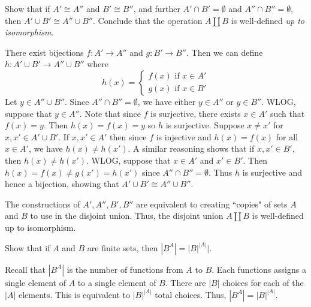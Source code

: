 \documentclass[../../master.tex]{subfiles}
\begin{document}
  \begin{problem}
    Show that if \(A' \cong A''\) and \(B' \cong B''\), and further \(A' \cap B' = \emptyset\) and \(A'' \cap B'' = \emptyset\), then \(A' \cup B' \cong A'' \cup B''\).
    Conclude that the operation \(A \coprod B\) is well-defined \textit{up to isomorphism}.
  \end{problem}

  \begin{solution}
    There exist bijections \(f: A' \to A''\) and \(g: B' \to B''\).
    Then we can define \(h: A' \cup B' \to A'' \cup B''\) where
    \begin{equation*}
      h(x) =
      \begin{cases}
        f(x) \text{ if } x \in A' \\
        g(x) \text{ if } x \in B'
      \end{cases}
    \end{equation*}
    Let \(y \in A'' \cup B''\). Since \(A'' \cap B'' = \emptyset\), we have either \(y \in A''\) or \(y \in B''\).
    WLOG, suppose that \(y \in A''\).
    Note that since \(f\) is surjective, there exists \(x \in A'\) such that \(f(x) = y\).
    Then \(h(x) = f(x) = y\) so \(h\) is surjective.
    Suppose \(x \neq x'\) for \(x, x' \in A' \cup B'\). If \(x, x' \in A'\) then since \(f\) is injective and \(h(x) = f(x)\) for all \(x \in A'\), we have \(h(x) \neq h(x')\).
    A similar reasoning shows that if \(x, x' \in B'\), then \(h(x) \neq h(x')\).
    WLOG, suppose that \(x \in A'\) and \(x' \in B'\). Then \(h(x) = f(x) \neq g(x') = h(x')\) since \(A'' \cap B'' = \emptyset\). Thus \(h\) is surjective and hence a bijection, showing that \(A' \cup B' \cong A'' \cup B''\).

    The constructions of \(A', A'', B', B''\) are equivalent to creating ``copies" of sets \(A\) and \(B\) to use in the disjoint union.
    Thus, the disjoint union \(A \coprod B\) is well-defined up to isomorphism.
  \end{solution}

  \begin{problem}
    Show that if \(A\) and \(B\) are finite sets, then \(|B^{A}| = |B|^{|A|}|\).
  \end{problem}

  \begin{solution}
    Recall that \(|B^{A}|\) is the number of functions from \(A\) to \(B\).
    Each functions assigns a single element of \(A\) to a single element of \(B\).
    There are \(|B|\) choices for each of the \(|A|\) elements.
    This is equivalent to \(|B|^{|A|}\) total choices.
    Thus, \(|B^{A}| = |B|^{|A|}\).
  \end{solution}
\end{document}
